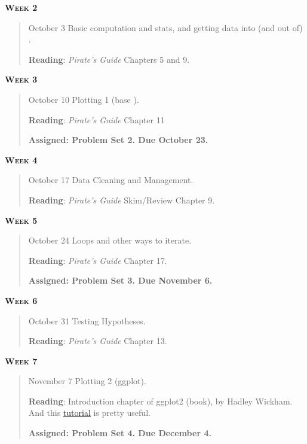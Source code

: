 \documentclass[11pt,letterpaper]{article}
\begin{document}
\textbf{\textsc{Week 2}}
		\begin{quote}	
		October 3  \textbullet \space Basic computation and stats, and getting data into (and out of) \R. 
		
		\textbf{Reading}: \textit{Pirate's Guide} Chapters 5 and 9.	
		\end{quote}

\textbf{\textsc{Week 3}}
		\begin{quote}	
		October 10  \textbullet \space Plotting 1 (base \R). 
		
		\textbf{Reading}: \textit{Pirate's Guide} Chapter 11

		\textbf{Assigned: Problem Set 2.  Due October 23.}

		\end{quote}

\textbf{\textsc{Week 4}}
		\begin{quote}	
		October 17  \textbullet \space Data Cleaning and Management. 
		
		\textbf{Reading}: \textit{Pirate's Guide} Skim/Review Chapter 9.
		\end{quote}


\textbf{\textsc{Week 5}}
		\begin{quote}	
		October 24  \textbullet \space Loops and other ways to iterate. 
		
		\textbf{Reading}: \textit{Pirate's Guide} Chapter 17.

		\textbf{Assigned: Problem Set 3.  Due November 6.}

		\end{quote}

\textbf{\textsc{Week 6}}
		\begin{quote}	
		October 31  \textbullet \space Testing Hypotheses. 
		
		\textbf{Reading}: \textit{Pirate's Guide} Chapter 13.
		\end{quote}


\textbf{\textsc{Week 7}}
		\begin{quote}	
		November 7  \textbullet \space Plotting 2 (ggplot). 
		
		\textbf{Reading}: Introduction chapter of ggplot2 (book), by Hadley Wickham.  And this \href{http://r-statistics.co/Complete-Ggplot2-Tutorial-Part1-With-R-Code.html}{\underline{tutorial}} is pretty useful.

		\textbf{Assigned: Problem Set 4.  Due December 4.}

		\end{quote}
\end{document}
